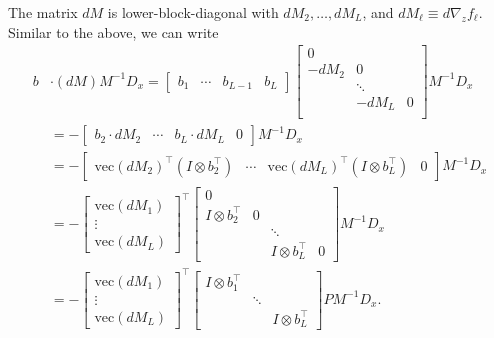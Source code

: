 \documentclass{article}
\begin{document}
The matrix $dM$ is lower-block-diagonal with $dM_2,\ldots, dM_L$, and $dM_\ell
    \equiv d \nabla_z f_\ell$. Similar to the above, we can write
\begin{align}
    b & \cdot (dM) M^{-1} D_x =
    \begin{bmatrix}
        b_1 & \cdots & b_{L-1} & b_L
    \end{bmatrix}
    \begin{bmatrix}
        0                  \\
        -dM_2 & 0          \\
              & \ddots     \\
              & -dM_L  & 0 \\
    \end{bmatrix}
    M^{-1} D_x                                                                   \\
    & = -\begin{bmatrix}
        b_2 \cdot dM_2 & \cdots & b_L \cdot dM_L & 0
    \end{bmatrix}
    M^{-1} D_x                                                                   \\
    & = -\begin{bmatrix}
        \mathrm{vec} \left(dM_2\right)^\top \left(I \otimes b_2^\top\right) &
        \cdots                                                              &
        \mathrm{vec} \left(dM_L\right)^\top \left(I \otimes b_L^\top\right) &
        0
    \end{bmatrix}
    M^{-1} D_x                                                                   \\
    & =
    -\begin{bmatrix}
        \mathrm{vec} \left(dM_1\right) \\
        \vdots                         \\
        \mathrm{vec} \left(dM_L\right)
    \end{bmatrix}
    ^\top
    \begin{bmatrix}
        0                                               \\
        I \otimes b_2^\top & 0                          \\
                           &   & \ddots                 \\
                           &   & I \otimes b_L^\top & 0
    \end{bmatrix}
    M^{-1} D_x                                                                   \\
    & = -\begin{bmatrix}
        \mathrm{vec} \left(dM_1\right) \\
        \vdots                         \\
        \mathrm{vec} \left(dM_L\right)
    \end{bmatrix}
    ^\top
    \begin{bmatrix}
        I \otimes b_1^\top \\ &\ddots  \\ && I \otimes b_L^\top
    \end{bmatrix}
    PM^{-1} D_x.
\end{align}
\end{document}
